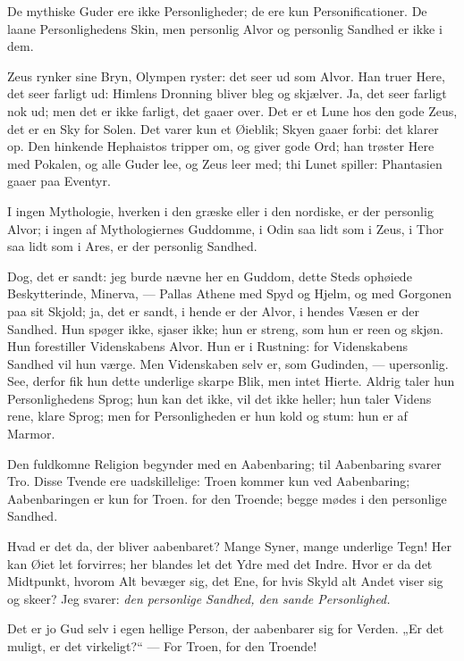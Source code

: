 \documentclass[12pt,a4paper]{book}
\newcommand{\apage}[1]{\marginnote{\footnotesize\textit{[#1]}}}
\begin{document}
De mythiske Guder ere ikke Personligheder; de ere kun Personificationer. De
laane Personlighedens Skin, men personlig Alvor og personlig Sandhed er ikke i
dem.

Zeus rynker sine Bryn, Olympen ryster: det seer ud som Alvor. Han truer Here,
det seer farligt ud: Himlens Dronning bliver bleg og skjælver. Ja, det seer
farligt nok ud; men det er ikke farligt, det gaaer over. Det er et Lune hos
den gode Zeus, det er en Sky for Solen. Det varer kun et Øieblik; Skyen gaaer
forbi: det klarer op. Den hinkende Hephaistos tripper om, og giver gode Ord;
han trøster Here med Pokalen, og alle Guder lee, og Zeus leer med; thi Lunet
spiller: Phantasien gaaer paa Eventyr.

I ingen Mythologie, hverken i den græske eller i den nordiske, er der
personlig Alvor; i ingen af Mythologiernes \apage{16}
Guddomme, i Odin saa lidt som i Zeus, i Thor saa lidt som i Ares, er der
personlig Sandhed.

Dog, det er sandt: jeg burde nævne her en Guddom, dette Steds ophøiede
Beskytterinde, Minerva, --- Pallas Athene med Spyd og Hjelm, og med Gorgonen
paa sit Skjold; ja, det er sandt, i hende er der Alvor, i hendes Væsen er der
Sandhed. Hun spøger ikke, sjaser ikke; hun er streng, som hun er reen og
skjøn. Hun forestiller Videnskabens Alvor. Hun er i Rustning: for
Videnskabens Sandhed vil hun værge. Men Videnskaben selv er, som Gudinden,
--- upersonlig. See, derfor fik hun dette underlige skarpe Blik, men intet
Hierte. Aldrig taler hun Personlighedens Sprog; hun kan det ikke, vil det
ikke heller; hun taler Videns rene, klare Sprog; men for Personligheden er
hun kold og stum: hun er af Marmor.

Den fuldkomne Religion begynder med en Aabenbaring; til Aabenbaring svarer
Tro. Disse Tvende ere uadskillelige: Troen kommer kun ved Aabenbaring;
Aabenbaringen er kun for Troen. for den Troende; begge mødes i den personlige
Sandhed. %

Hvad er det da, der bliver aabenbaret? Mange Syner, mange underlige Tegn! Her
kan Øiet let forvirres; her blandes let det Ydre med det Indre. Hvor er da det
Midtpunkt, hvorom Alt bevæger sig, det Ene, for hvis Skyld alt Andet viser sig
og skeer? Jeg svarer: \emph{den personlige Sandhed, den sande Personlighed.}

Det er jo Gud selv i egen hellige Person, der aabenbarer sig for Verden. „Er
det muligt, er det virkeligt?“ --- For Troen, for den Troende!
\end{document}
